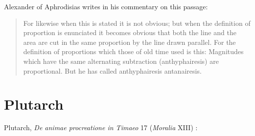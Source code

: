 \documentclass{amsart}
\theoremstyle{definition}
\begin{document}
Alexander of Aphrodisias \cite[p.~507]{thomasI} writes in his commentary on this passage:

\begin{quote}
For likewise when this is stated it is not obvious; but when the definition of proportion is enunciated it becomes obvious that both the line and the area are cut in the same proportion by the line drawn parallel. For the definition of proportions which those of old time used is this: Magnitudes which have the same alternating subtraction (anthyphairesis) are proportional. But he has called anthyphairesis antanairesis.
\end{quote}





\section{Plutarch}
Plutarch, {\em De animae procreatione in Timaeo} 17 ({\em Moralia} XIII) \cite[pp.~303--309]{chernissI}:
\end{document}
